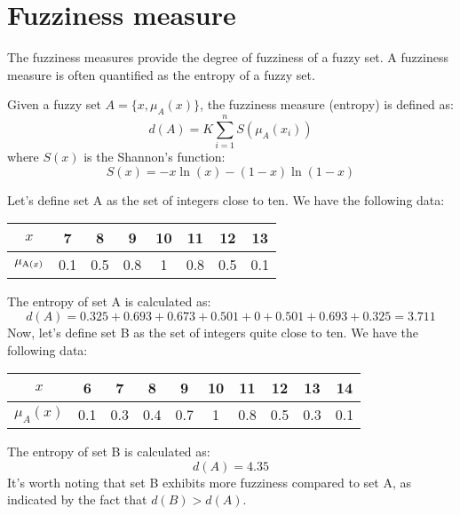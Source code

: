 \section{Fuzziness measure}

The fuzziness measures provide the degree of fuzziness of a fuzzy set. A fuzziness measure is often quantified as the entropy of a fuzzy set.
\begin{definition}
    Given a fuzzy set $A=\{x,\mu_A(x)\}$, the fuzziness measure (entropy) is defined as:
    \[d(A)=K \sum_{i=1}^{n}S(\mu_A(x_i))\]
    where $S(x)$ is the Shannon's function: 
    \[S(x)=-x \ln(x)-(1-x)\ln(1-x)\]
\end{definition}
\begin{example}
    Let's define set A as the set of integers close to ten. We have the following data:
    \begin{center}
        \begin{tabular}{|c|c|c|c|c|c|c|c|} 
        \hline
            $x$ & 7 & 8 & 9 & 10 & 11 & 12 & 13 \\ \hline
            $\mu_{\textnormal{A}(x)}$ & 0.1 & 0.5 & 0.8 & 1 & 0.8 & 0.5 & 0.1 \\ \hline
        \end{tabular}
    \end{center}
    The entropy of set A is calculated as:
    \[d(A)=0.325+0.693+0.673+0.501+0+0.501+0.693+0.325=3.711\]
    Now, let's define set B as the set of integers quite close to ten. We have the following data:
    \begin{center}
        \begin{tabular}{|c|c|c|c|c|c|c|c|c|c|} 
            \hline
            $x$         & 6     & 7     & 8     & 9     & 10    & 11    & 12    & 13    & 14 \\ \hline
            $\mu_A(x)$  & 0.1   & 0.3   & 0.4   & 0.7   & 1     & 0.8   & 0.5   & 0.3   & 0.1 \\ \hline
        \end{tabular}
    \end{center}
    The entropy of set B is calculated as:
    \[d(A)=4.35\]
    It's worth noting that set B exhibits more fuzziness compared to set A, as indicated by the fact that $d(B)>d(A)$.
\end{example}